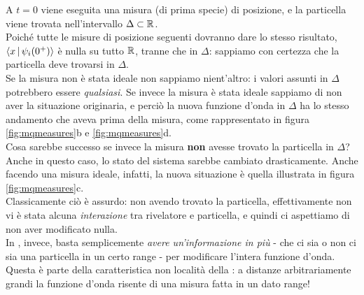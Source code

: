 \documentclass[../../FisicaTeorica.tex]{subfiles}
\begin{document}
A $t=0$ viene eseguita una misura (di prima specie) di posizione, e la particella viene trovata nell'intervallo $\Delta \subset \mathbb{R}$.\\
Poiché tutte le misure di posizione seguenti dovranno dare lo stesso risultato, $\Braket{x|\psi_i(0^+)}$ è nulla su tutto $\mathbb{R}$, tranne che in $\Delta$: sappiamo con certezza che la particella deve trovarsi in $\Delta$.\\
Se la misura non è stata ideale non sappiamo nient'altro: i valori assunti in $\Delta$ potrebbero essere \textit{qualsiasi}. Se invece la misura è stata ideale sappiamo di non aver  la situazione originaria, e perciò la nuova funzione d'onda in $\Delta$ ha lo stesso andamento che aveva prima della misura, come rappresentato in figura \ref{fig:mqmeasures}b e \ref{fig:mqmeasures}d.\\
Cosa sarebbe successo se invece la misura \textbf{non} avesse trovato la particella in $\Delta$?\\
Anche in questo caso, lo stato del sistema sarebbe cambiato drasticamente. Anche facendo una misura ideale, infatti, la nuova situazione è quella illustrata in figura \ref{fig:mqmeasures}c.\\
Classicamente ciò è assurdo: non avendo trovato la particella, effettivamente non vi è stata alcuna \textit{interazione} tra rivelatore e particella, e quindi ci aspettiamo di non aver modificato nulla.\\
In \MQ, invece, basta semplicemente \textit{avere un'informazione in più} - che ci sia o non ci sia una particella in un certo range - per modificare l'intera funzione d'onda.\\
Questa è parte della caratteristica non località della \MQ: a distanze arbitrariamente grandi la funzione d'onda risente di una misura fatta in un dato range!
\end{document}
